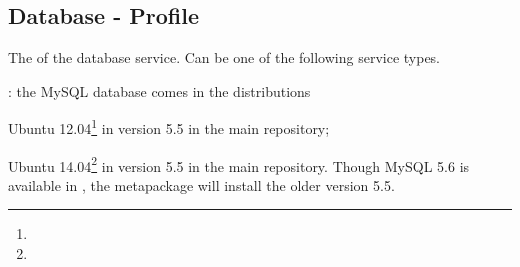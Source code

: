 \label{sec:database_profile}
\subsection{Database - Profile}


The  of the database service. Can be one of the following 
service types.
\begin{asparaitem}
%
\item[\qcode{mysql}:] 
the MySQL database comes in the distributions 
\begin{compactitem}
\item[\TheDistribution{ubuntu}] Ubuntu 12.04\footnote{\TheUbuntuPreciseLTSDate} in version 5.5 in the main repository;
\item[\TheDistribution{ubuntu}] Ubuntu 14.04\footnote{\TheUbuntuTrustyLTSDate} in version 5.5 in the main repository.
Though MySQL 5.6 is available in \TheUbuntuTrustyLTSDate, the  metapackage will install the older version 5.5.
\end{compactitem}
%
\end{asparaitem}


